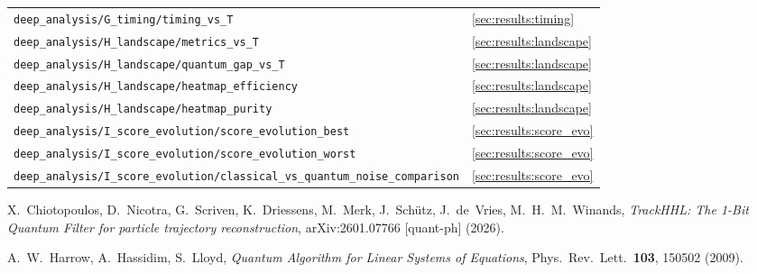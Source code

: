 \documentclass[11pt,a4paper]{article}
\newcommand{\codepath}[1]{\texttt{#1}}
\begin{document}
\begin{table}[H]
\begin{tabular}{p{8.5cm}l}
    \codepath{deep\_analysis/G\_timing/timing\_vs\_T} &
      \ref{sec:results:timing} \\
    \codepath{deep\_analysis/H\_landscape/metrics\_vs\_T} &
      \ref{sec:results:landscape} \\
    \codepath{deep\_analysis/H\_landscape/quantum\_gap\_vs\_T} &
      \ref{sec:results:landscape} \\
    \codepath{deep\_analysis/H\_landscape/heatmap\_efficiency} &
      \ref{sec:results:landscape} \\
    \codepath{deep\_analysis/H\_landscape/heatmap\_purity} &
      \ref{sec:results:landscape} \\
    \codepath{deep\_analysis/I\_score\_evolution/score\_evolution\_best} &
      \ref{sec:results:score_evo} \\
    \codepath{deep\_analysis/I\_score\_evolution/score\_evolution\_worst} &
      \ref{sec:results:score_evo} \\
    \codepath{deep\_analysis/I\_score\_evolution/classical\_vs\_quantum\_noise\_comparison} &
      \ref{sec:results:score_evo} \\
    \bottomrule
  \end{tabular}
\end{table}

\begin{thebibliography}{9}
  X.~Chiotopoulos, D.~Nicotra, G.~Scriven, K.~Driessens, M.~Merk,
  J.~Sch\"{u}tz, J.~de~Vries, M.~H.~M.~Winands,
  \textit{TrackHHL: The 1-Bit Quantum Filter for particle trajectory reconstruction},
  arXiv:2601.07766 [quant-ph] (2026).

  A.~W.~Harrow, A.~Hassidim, S.~Lloyd,
  \textit{Quantum Algorithm for Linear Systems of Equations},
  Phys.\ Rev.\ Lett.\ \textbf{103}, 150502 (2009).
\end{thebibliography}
\end{document}
